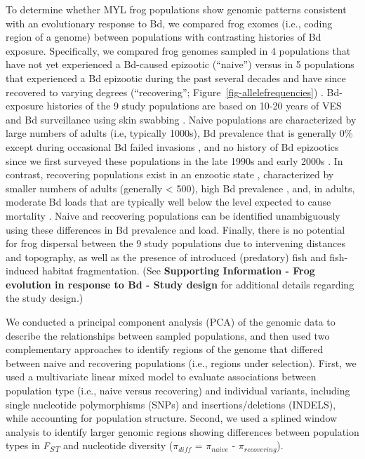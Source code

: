 \documentclass[9pt,twocolumn,twoside,lineno]{pnas-new}
\begin{document}
To determine whether MYL frog populations show genomic patterns
consistent with an evolutionary response to Bd, we compared frog exomes
(i.e., coding region of a genome) between populations with contrasting
histories of Bd exposure. Specifically, we compared frog genomes sampled
in 4 populations that have not yet experienced a Bd-caused epizootic
(``naive'') \citep{zhou2015} versus in 5 populations that experienced a
Bd epizootic during the past several decades and have since recovered to
varying degrees (``recovering''; Figure~\ref{fig-allelefrequencies})
\citep{knapp2016, vredenburg2010}. Bd-exposure histories of the 9 study
populations are based on 10-20 years of VES and Bd surveillance using
skin swabbing \citep[e.g.,][]{knapp2016, zhou2015, wilber2022}. Naive
populations are characterized by large numbers of adults (i.e, typically
1000s), Bd prevalence that is generally 0\% except during occasional Bd
failed invasions \citep[during which Bd loads remain very
low,][]{wilber2022}, and no history of Bd epizootics since we first
surveyed these populations in the late 1990s and early 2000s
\citep{zhou2015}. In contrast, recovering populations exist in an
enzootic state \citep{briggs2010}, characterized by smaller numbers of
adults (generally \textless{} 500), high Bd prevalence \citep[often
\textgreater{} 80\%,][]{knapp2011}, and, in adults, moderate Bd loads
that are typically well below the level expected to cause mortality
\citep{vredenburg2010}. Naive and recovering populations can be
identified unambiguously using these differences in Bd prevalence and
load. Finally, there is no potential for frog dispersal between the 9
study populations due to intervening distances and topography, as well
as the presence of introduced (predatory) fish and fish-induced habitat
fragmentation. (See \textbf{Supporting Information - Frog evolution in
response to Bd - Study design} for additional details regarding the
study design.)

We conducted a principal component analysis (PCA) of the genomic data to
describe the relationships between sampled populations, and then used
two complementary approaches to identify regions of the genome that
differed between naive and recovering populations (i.e., regions under
selection). First, we used a multivariate linear mixed model to evaluate
associations between population type (i.e., naive versus recovering) and
individual variants, including single nucleotide polymorphisms (SNPs)
and insertions/deletions (INDELS), while accounting for population
structure. Second, we used a splined window analysis to identify larger
genomic regions showing differences between population types in
\emph{F\textsubscript{ST}} and nucleotide diversity (\(\pi_{diff}\) =
\(\pi_{naive}\) - \(\pi_{recovering}\)).
\end{document}
